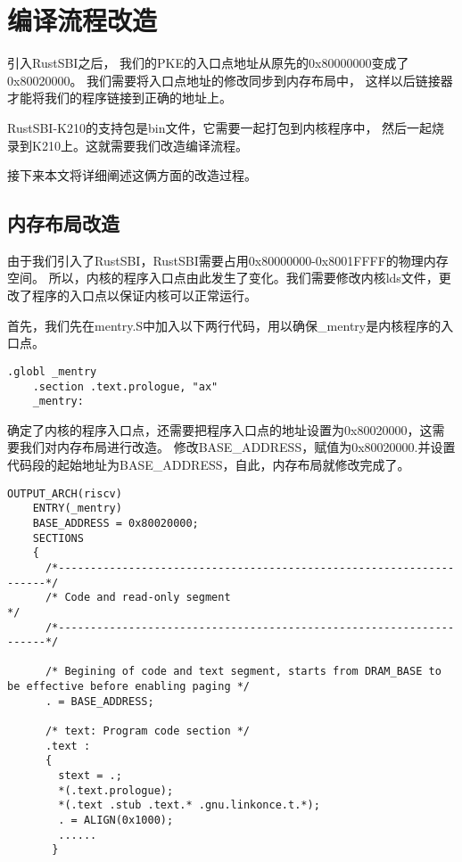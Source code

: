 \section{编译流程改造}

引入RustSBI之后，
我们的PKE的入口点地址从原先的0x80000000变成了0x80020000。
我们需要将入口点地址的修改同步到内存布局中，
这样以后链接器才能将我们的程序链接到正确的地址上。

RustSBI-K210的支持包是bin文件，它需要一起打包到内核程序中，
然后一起烧录到K210上。这就需要我们改造编译流程。

接下来本文将详细阐述这俩方面的改造过程。

\subsection{内存布局改造}
由于我们引入了RustSBI，RustSBI需要占用0x80000000-0x8001FFFF的物理内存空间。
所以，内核的程序入口点由此发生了变化。我们需要修改内核lds文件，更改了程序的入口点以保证内核可以正常运行。

首先，我们先在mentry.S中加入以下两行代码，用以确保\_mentry是内核程序的入口点。

\begin{lstlisting}[caption={修改内核程序入口点}, label={lst:change_kernel_entry}]
    .globl _mentry
    .section .text.prologue, "ax"
    _mentry:
\end{lstlisting}

确定了内核的程序入口点，还需要把程序入口点的地址设置为0x80020000，这需要我们对内存布局进行改造。
修改BASE\_ADDRESS，赋值为0x80020000.并设置代码段的起始地址为BASE\_ADDRESS，自此，内存布局就修改完成了。

\begin{lstlisting}[caption={修改内存布局}, label={lst:change_memory_layout}]
    OUTPUT_ARCH(riscv)
    ENTRY(_mentry)
    BASE_ADDRESS = 0x80020000;
    SECTIONS
    {
      /*--------------------------------------------------------------------*/
      /* Code and read-only segment                                         */
      /*--------------------------------------------------------------------*/
    
      /* Begining of code and text segment, starts from DRAM_BASE to be effective before enabling paging */
      . = BASE_ADDRESS;
      
      /* text: Program code section */
      .text : 
      {
        stext = .;
        *(.text.prologue);
        *(.text .stub .text.* .gnu.linkonce.t.*);
        . = ALIGN(0x1000);
        ......
       }
    
\end{lstlisting}


